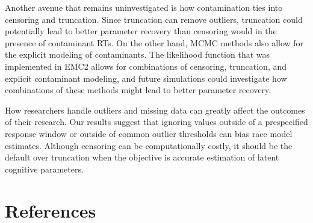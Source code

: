 \documentclass[
  stu,
  floatsintext,
  longtable,
  nolmodern,
  notxfonts,
  notimes,
  draftfirst,
  colorlinks=true,linkcolor=blue,citecolor=blue,urlcolor=blue]{apa7}
\begin{document}
Another avenue that remains uninvestigated is how contamination ties
into censoring and truncation. Since truncation can remove outliers,
truncation could potentially lead to better parameter recovery than
censoring would in the presence of contaminant RTs. On the other hand,
MCMC methods also allow for the explicit modeling of contaminants. The
likelihood function that was implemented in EMC2 allows for combinations
of censoring, truncation, and explicit contaminant modeling, and future
simulations could investigate how combinations of these methods might
lead to better parameter recovery.

How researchers handle outliers and missing data can greatly affect the
outcomes of their research. Our results suggest that ignoring values
outside of a prespecified response window or outside of common outlier
thresholds can bias race model estimates. Although censoring can be
computationally costly, it should be the default over truncation when
the objective is accurate estimation of latent cognitive parameters.

\newpage{}

\section{References}\label{references}
\end{document}
